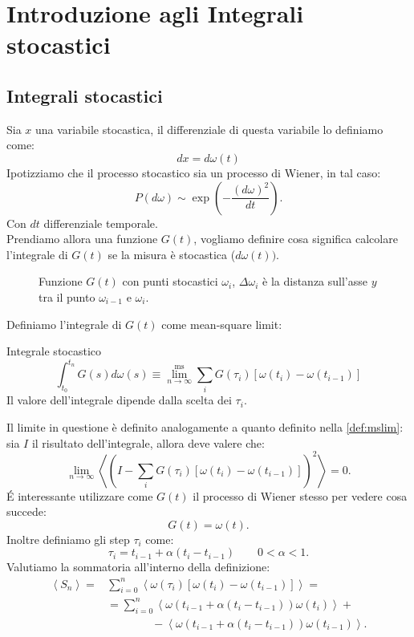 \section{Introduzione agli Integrali stocastici}%
\label{sub:Lezione 7}
\mylocaltoc
\subsection{Integrali stocastici}%
\label{sub:Integrali stocastici}
Sia $x$ una variabile stocastica, il differenziale di questa variabile lo definiamo come:
\begin{equation}
    dx = d\omega (t) \label{eq:6_int}
\end{equation}
Ipotizziamo che il processo stocastico sia un processo di Wiener, in tal caso:
\[
    P(d\omega) \sim \exp\left(-\frac{\left(d\omega\right)^2}{dt}\right)
.\] 
Con $dt$ differenziale temporale.\\
Prendiamo allora una funzione $G(t)$, vogliamo definire cosa significa calcolare l'integrale di $G(t)$ se la misura è stocastica ($d\omega (t))$.
\begin{figure}[H]
    \centering
    \caption{\scriptsize Funzione $G(t)$ con punti stocastici $\omega_i$, $\Delta\omega_i$ è la distanza sull'asse $y$ tra il punto $\omega_{i-1}$ e $\omega_i$.}
    \label{fig:lez_6_int}
\end{figure}
\noindent
Definiamo l'integrale di $G(t)$ come mean-square limit:
\begin{redbox}{Integrale stocastico}
\[
    \int_{t_0}^{t_n} G(s) d\omega (s) \equiv \lim^{\text{ms}}_{n \to \infty} \sum_{i}^{} G(\tau_i) \left[\omega (t_i) - \omega (t_{i-1}) \right]
\] 
Il valore dell'integrale dipende dalla scelta dei $\tau_i$.
\end{redbox}
\noindent
Il limite in questione è definito analogamente a quanto definito nella \ref{def:mslim}: sia $I$ il risultato dell'integrale, allora deve valere che:
\[
    \lim_{n \to \infty} \left<\left(I -  \sum_{i}^{} G(\tau_i) \left[\omega (t_i) - \omega (t_{i-1}) \right]\right)^2\right> = 0
.\] 
\'E interessante utilizzare come $G(t)$ il processo di Wiener stesso per vedere cosa succede:
\[
    G(t) = \omega (t) 
.\]
Inoltre definiamo gli step $\tau_i$ come:
\begin{equation}
    \tau_i = t_{i-1} + \alpha (t_i - t_{i-1}) \qquad 0 <\alpha <1 \label{eq:tau}
.\end{equation}
Valutiamo la sommatoria all'interno della definizione:
\[\begin{aligned}
    \left<S_n\right> =& \sum_{i=0}^{n} \left<\omega (\tau_i)\left[ \omega (t_i) - \omega (t_{i-1})  \right] \right>=\\
		      & = \sum_{i=0}^{n} \left<\omega (t_{i-1} +\alpha (t_i-t_{i-1}) ) \omega(t_i) \right> + \\
		  & \qquad \qquad - \left<\omega (t_{i-1} +\alpha (t_i-t_{i-1}) ) \omega(t_{i-1}) \right>
.\end{aligned}\]
